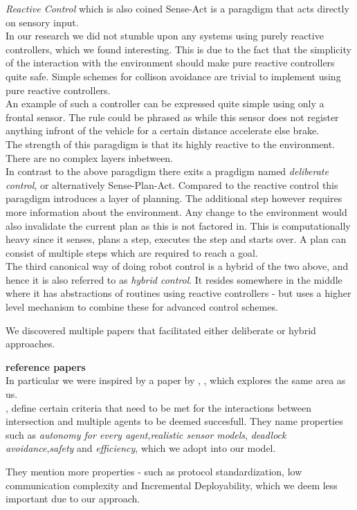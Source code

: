 \textit{Reactive Control} which is also coined Sense-Act is a paragdigm that acts directly on sensory input.\\
In our research we did not stumble upon any systems using purely reactive controllers, which we found interesting. This is due to the fact that the simplicity of the interaction with the environment should make pure reactive controllers quite safe.
Simple schemes for collison avoidance are trivial to implement using pure reactive controllers.\\
An example of such a controller can be expressed quite simple using only a frontal sensor. The rule could be phrased as while this sensor does not register anything infront of the vehicle for a certain distance accelerate else brake.\\
The strength of this paragdigm is that its highly reactive to the environment. There are no complex layers inbetween.\\

In contrast to the above paragdigm there exits a pragdigm named \textit{deliberate control}, or alternatively Sense-Plan-Act.
Compared to the reactive control this paragdigm introduces a layer of planning.
The additional step however requires more information about the environment.
Any change to the environment would also invalidate the current plan as this is not factored in.
This is computationally heavy since it senses, plans a step, executes the step and starts over.
A plan can consist of multiple steps which are required to reach a goal.\\

The third canonical way of doing robot control is a hybrid of the two above, and hence it is also referred to as \textit{hybrid control}.
It resides somewhere in the middle where it has abstractions of routines using reactive controllers - but uses a higher level mechanism to combine these for advanced control schemes.

We discovered multiple papers that facilitated either deliberate or hybrid approaches.

\textbf{reference papers}\\

In particular we were inspired by a paper by \citeauthor{texas}, \citep{texas}, which explores the same area as us.\\
\citeauthor{texas}, define certain criteria that need to be met for the interactions between intersection and multiple agents to be deemed succesfull.
They name properties such as \textit{autonomy for every agent},\textit{realistic sensor models}, \textit{deadlock avoidance},\textit{safety} and \textit{efficiency}, which we adopt into our model.

They mention more properties - such as protocol standardization, low communication complexity and Incremental Deployability, which we deem less important due to our approach.
